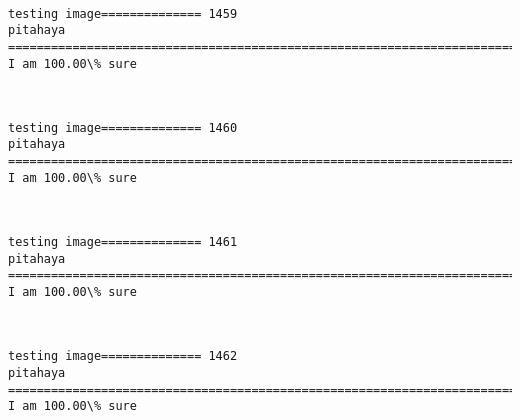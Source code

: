 \documentclass[11pt]{article}
\begin{document}
    \begin{center}
    \end{center}
    { \hspace*{\fill} \\}
    
    \begin{Verbatim}[commandchars=\\\{\}]
testing image============== 1459
pitahaya
============================================================================
I am 100.00\% sure

    \end{Verbatim}

    \begin{center}
    \end{center}
    { \hspace*{\fill} \\}
    
    \begin{Verbatim}[commandchars=\\\{\}]
testing image============== 1460
pitahaya
============================================================================
I am 100.00\% sure

    \end{Verbatim}

    \begin{center}
    \end{center}
    { \hspace*{\fill} \\}
    
    \begin{Verbatim}[commandchars=\\\{\}]
testing image============== 1461
pitahaya
============================================================================
I am 100.00\% sure

    \end{Verbatim}

    \begin{center}
    \end{center}
    { \hspace*{\fill} \\}
    
    \begin{Verbatim}[commandchars=\\\{\}]
testing image============== 1462
pitahaya
============================================================================
I am 100.00\% sure

    \end{Verbatim}
\end{document}
